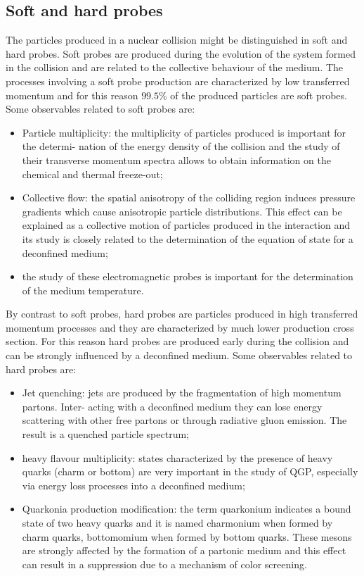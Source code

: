 \subsection{Soft and hard probes}
The particles produced in a nuclear collision might be distinguished in soft and hard probes.
Soft probes are produced during the evolution of the system formed in the collision and are related to the collective behaviour of the medium.
The processes involving a soft probe production are characterized by low transferred momentum and for this reason $99.5\%$ of the produced particles are soft probes.
Some observables related to soft probes are:
\begin{itemize}
    \item Particle multiplicity: the multiplicity of particles produced is important for the determi- nation of the energy density of the collision and the study of their transverse momentum spectra allows to obtain information on the chemical and thermal freeze-out;
    \item Collective flow: the spatial anisotropy of the colliding region induces pressure gradients which cause anisotropic particle distributions. This effect can be explained as a collective motion of particles produced in the interaction and its study is closely related to the determination of the equation of state for a deconfined medium;
    \item the study of these electromagnetic probes is important for the determination of the medium temperature.
\end{itemize}
By contrast to soft probes, hard probes are particles produced in high transferred momentum processes and they are characterized by much lower production cross section.
For this reason hard probes are produced early during the collision and can be strongly influenced by a deconfined medium.
Some observables related to hard probes are:
\begin{itemize}
    \item Jet quenching: jets are produced by the fragmentation of high momentum partons. Inter- acting with a deconfined medium they can lose energy scattering with other free partons or through radiative gluon emission. The result is a quenched particle spectrum;
    \item heavy flavour multiplicity: states characterized by the presence of heavy quarks (charm or bottom) are very important in the study of QGP, especially via energy loss processes into a deconfined medium;
    \item Quarkonia production modification: the term quarkonium indicates a bound state of two heavy quarks and it is named charmonium when formed by charm quarks, bottomomium when formed by bottom quarks. These mesons are strongly affected by the formation of a partonic medium and this effect can result in a suppression due to a mechanism of color screening.
\end{itemize}

